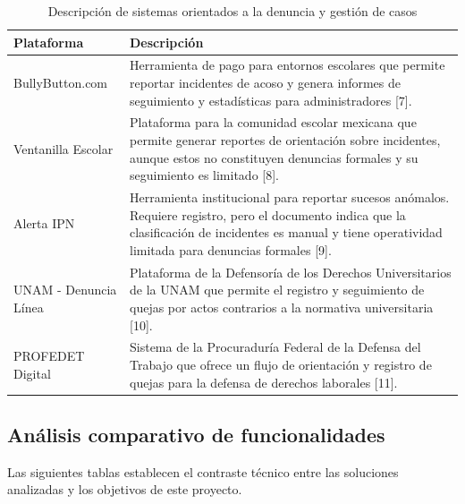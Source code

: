     \begin{table}[h]
    \centering
    \caption{Descripción de sistemas orientados a la denuncia y gestión de casos}
    \label{tab:estado-arte}
    \begin{tabular}{|p{3cm}|p{9.5cm}|}
        \hline
        \textbf{Plataforma} & \textbf{Descripción} \\
        \hline
        BullyButton.com & Herramienta de pago para entornos escolares que permite reportar incidentes de acoso y genera informes de seguimiento y estadísticas para administradores [7]. \\
        \hline
        Ventanilla Escolar & Plataforma para la comunidad escolar mexicana que permite generar reportes de orientación sobre incidentes, aunque estos no constituyen denuncias formales y su seguimiento es limitado [8]. \\
        \hline
        Alerta IPN & Herramienta institucional para reportar sucesos anómalos. Requiere registro, pero el documento indica que la clasificación de incidentes es manual y tiene operatividad limitada para denuncias formales [9]. \\
        \hline
        UNAM - Denuncia Línea & Plataforma de la Defensoría de los Derechos Universitarios de la UNAM que permite el registro y seguimiento de quejas por actos contrarios a la normativa universitaria [10]. \\
        \hline
        PROFEDET Digital & Sistema de la Procuraduría Federal de la Defensa del Trabajo que ofrece un flujo de orientación y registro de quejas para la defensa de derechos laborales [11]. \\
        \hline
    \end{tabular}
    \end{table}

    \subsection{Análisis comparativo de funcionalidades}
        
        Las siguientes tablas establecen el contraste técnico entre las soluciones analizadas y los objetivos de este proyecto.
        
